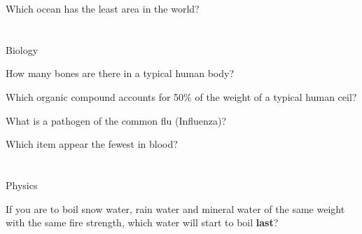 \documentclass{cie}
\begin{document}
  \begin{question}%
    Which ocean has the least area in the world?

    \setanswer
  \end{question}

  \section{}{Biology}

  \begin{question}%
    How many bones are there in a typical human body?

    \setanswer
  \end{question}

  \begin{question}%
    Which organic compound accounts for 50\% of the weight of a typical human ceil?

    \setanswer
  \end{question}

  \begin{question}%
    What is a pathogen of the common flu (Influenza)?

    \setanswer
  \end{question}

  \begin{question}%
    Which item appear the fewest in blood?

    \setanswer
  \end{question}

  \section{}{Physics}

  \begin{question}%
    If you are to boil snow water, rain water and mineral water of the same weight with the same fire strength, which water will start to boil \textbf{last}?

    \setanswer
  \end{question}
\end{document}
